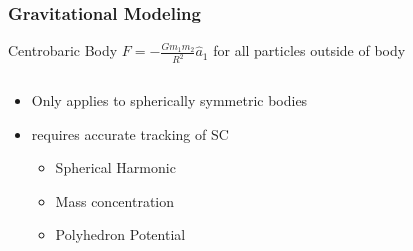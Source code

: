 \begin{frame}[noframenumbering,label=centrobaric]
\frametitle{Gravitational Modeling}
\begin{block}{Centrobaric Body}
    \( F = -\frac{G m_1 m_2}{R^2} \hat{a}_1 \) for all particles outside of body
\end{block}

\begin{columns}
    \begin{column}{0.5\textwidth}
        \begin{itemize}
            \item<2-> Only applies to spherically symmetric bodies 
            \item<3->  requires accurate tracking of SC
                \begin{itemize}
                    \item Spherical Harmonic
                    \item Mass concentration
                    \item Polyhedron Potential
                \end{itemize}
        \end{itemize}
    \end{column}
    \begin{column}{0.5\textwidth}
    \end{column}
\end{columns}

\end{frame}

